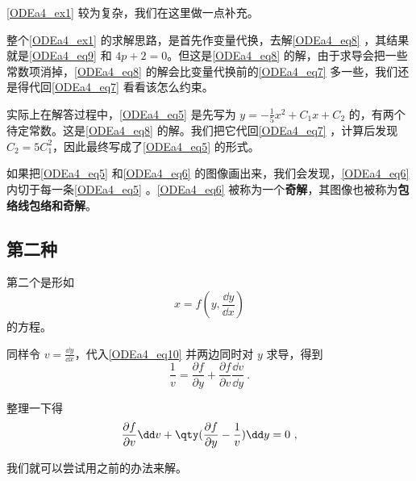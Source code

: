 \autoref{ODEa4_ex1} 较为复杂，我们在这里做一点补充。

整个\autoref{ODEa4_ex1} 的求解思路，是首先作变量代换，去解\autoref{ODEa4_eq8} ，其结果就是\autoref{ODEa4_eq9} 和 $4p+2=0$。但这是\autoref{ODEa4_eq8} 的解，由于求导会把一些常数项消掉，\autoref{ODEa4_eq8} 的解会比变量代换前的\autoref{ODEa4_eq7} 多一些，我们还是得代回\autoref{ODEa4_eq7} 看看该怎么约束。

实际上在解答过程中，\autoref{ODEa4_eq5} 是先写为 $y=-\frac{1}{5}x^2+C_1x+C_2$ 的，有两个待定常数。这是\autoref{ODEa4_eq8} 的解。我们把它代回\autoref{ODEa4_eq7} ，计算后发现 $C_2=5C_1^2$，因此最终写成了\autoref{ODEa4_eq5} 的形式。

如果把\autoref{ODEa4_eq5} 和\autoref{ODEa4_eq6} 的图像画出来，我们会发现，\autoref{ODEa4_eq6} 内切于每一条\autoref{ODEa4_eq5} 
。\autoref{ODEa4_eq6} 被称为一个\textbf{奇解}，其图像也被称为\textbf{包络线包络和奇解}。








\subsection{第二种}

第二个是形如
\begin{equation}\label{ODEa4_eq10}
x=f(y, \frac{\dd y}{\dd x})
\end{equation}
的方程。

同样令 $v=\frac{\dd y}{\dd x}$，代入\autoref{ODEa4_eq10} 并两边同时对 $y$ 求导，得到
\begin{equation}
\frac{1}{v}=\frac{\partial f}{\partial y}+\frac{\partial f}{\partial v}\frac{\dd v}{\dd y}~.
\end{equation}

整理一下得
\begin{equation}\label{ODEa4_eq13}
\frac{\partial f}{\partial v}\dd v +\qty(\frac{\partial f}{\partial y}-\frac{1}{v})\dd y=0~,
\end{equation}

我们就可以尝试用之前的办法来解。

